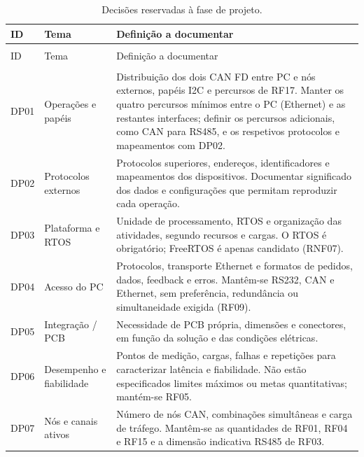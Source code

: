 \begingroup
\small
{}
\setlength{\tabcolsep}{4pt}
\renewcommand{\arraystretch}{1.15}
\begin{longtable}{@{}>{\raggedright\arraybackslash}p{}>{\raggedright\arraybackslash}p{}>{\raggedright\arraybackslash}p{}@{}}
\caption{Decisões reservadas à fase de projeto.}\label{tab:decisoes-projeto}\\
\toprule
\rowcolor{LasetTint}
ID & Tema & Definição a documentar \\
\midrule
\endfirsthead
\multicolumn{3}{c}{\tablename~\thetable{} (continuação)}\\
\toprule
\rowcolor{LasetTint}
ID & Tema & Definição a documentar \\
\midrule
\endhead
\midrule
\multicolumn{3}{r}{Continua na página seguinte}\\
\endfoot
\bottomrule
\endlastfoot
DP01 & Operações e papéis & Distribuição dos dois CAN FD entre PC e nós externos, papéis I2C e percursos de RF17. Manter os quatro percursos mínimos entre o PC (Ethernet) e as restantes interfaces; definir os percursos adicionais, como CAN para RS485, e os respetivos protocolos e mapeamentos com DP02. \\
\addlinespace
DP02 & Protocolos externos & Protocolos superiores, endereços, identificadores e mapeamentos dos dispositivos. Documentar significado dos dados e configurações que permitam reproduzir cada operação. \\
\addlinespace
DP03 & Plataforma e RTOS & Unidade de processamento, RTOS e organização das atividades, segundo recursos e cargas. O RTOS é obrigatório; FreeRTOS é apenas candidato (RNF07). \\
\addlinespace
DP04 & Acesso do PC & Protocolos, transporte Ethernet e formatos de pedidos, dados, feedback e erros. Mantêm-se RS232, CAN e Ethernet, sem preferência, redundância ou simultaneidade exigida (RF09). \\
\addlinespace
DP05 & Integração / PCB & Necessidade de PCB própria, dimensões e conectores, em função da solução e das condições elétricas. \\
\addlinespace
DP06 & Desempenho e fiabilidade & Pontos de medição, cargas, falhas e repetições para caracterizar latência e fiabilidade. Não estão especificados limites máximos ou metas quantitativas; mantém-se RF05. \\
\addlinespace
DP07 & Nós e canais ativos & Número de nós CAN, combinações simultâneas e carga de tráfego. Mantêm-se as quantidades de RF01, RF04 e RF15 e a dimensão indicativa RS485 de RF03. \\

\end{longtable}
